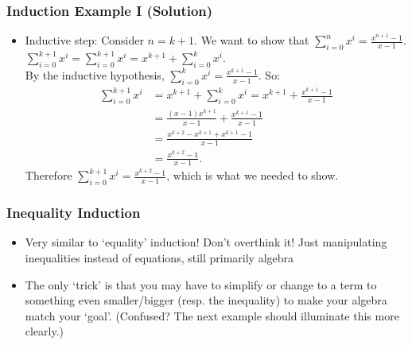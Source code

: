 \documentclass{beamer}
\begin{document}
\begin{frame}[t]
  \frametitle{Induction Example I (Solution)}
  \begin{itemize}
    \item Inductive step: Consider $n= k+1$. We want to show that $\sum^{n}_{i=0} x^i = \frac{x^{n+1}-1}{x-1}$. \\
    $\sum^{k+1}_{i=0} x^i = \sum_{i=0}^{k+1} x^i = x^{k+1} + \sum_{i=0}^k x^i$. \\
    By the inductive hypothesis, $\sum_{i=0}^k x^i = \frac{x^{k+1}-1}{x-1}$. So:
    \begin{align*}
        \sum_{i=0}^{k+1} x^i &= x^{k+1} + \sum_{i=0}^k x^i = 
x^{k+1} + \frac{x^{k+1}-1}{x-1} \\
&= \frac{(x-1)x^{k+1}}{x-1} + \frac{x^{k+1}-1}{x-1} \\
&= \frac{x^{k+2}-x^{k+1}+ x^{k+1}-1}{x-1} \\
&= \frac{x^{k+2}-1}{x-1}. 
    \end{align*}
    Therefore $\sum^{k+1}_{i=0} x^i = \frac{x^{k+2}-1}{x-1}$, which is what we needed to show.
  \end{itemize}
\end{frame}


\begin{frame}[t]
  \frametitle{Inequality Induction}
  \begin{itemize}[<+->]
      \item Very similar to `equality' induction! Don't overthink it! Just manipulating inequalities instead of equations, still primarily algebra
      \item The only `trick' is that you may have to simplify or change to a term to something even smaller/bigger (resp. the inequality) to make your algebra match your `goal'. (Confused? The next example should illuminate this more clearly.)

    \end{itemize}

\end{frame}
\end{document}
